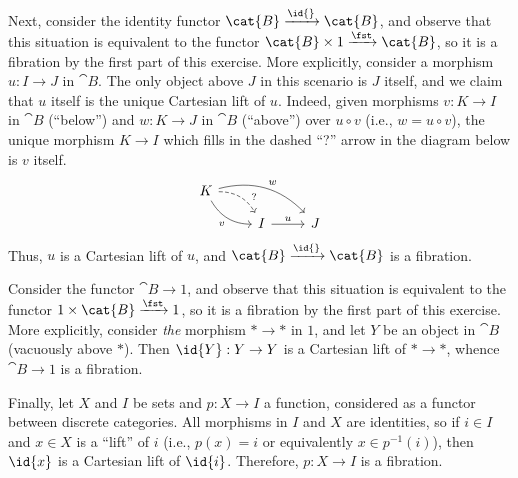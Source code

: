 \begin{solution}
Next, consider the identity functor \(\cat{B} \xrightarrow{\id{}} \cat{B}\), and observe that this situation is equivalent to the functor \(\cat{B} \times 1 \xrightarrow{\fst} \cat{B}\), so it is a fibration by the first part of this exercise.
More explicitly, consider a morphism \(u : I \to J\) in \(\cat{B}\).
The only object above \(J\) in this scenario is \(J\) itself, and we claim that \(u\) itself is the unique Cartesian lift of \(u\).
Indeed, given morphisms \(v : K \to I\) in \(\cat{B}\) (``below'') and \(w : K \to J\) in \(\cat{B}\) (``above'') over \(u \circ v\) (i.e., \(w = u \circ v\)), the unique morphism \(K \to I\) which fills in the dashed ``?'' arrow in the diagram below is \(v\) itself.
\begin{equation*}
\begin{tikzcd}[row sep=small]
K \arrow[rd, bend left, dashed, near end, "?"] \arrow[rd, bend right, "v"{below left}] \arrow[rrd, bend left, "w"] \\
& I \arrow[r, "u"] & J
\end{tikzcd}
\end{equation*}
Thus, \(u\) is a Cartesian lift of \(u\), and \(\cat{B} \xrightarrow{\id{}} \cat{B}\) is a fibration.

Consider the functor \(\cat{B} \to 1\), and observe that this situation is equivalent to the functor \(1 \times \cat{B} \xrightarrow{\fst} 1\), so it is a fibration by the first part of this exercise.
More explicitly, consider \emph{the} morphism \(* \to *\) in \(1\), and let \(Y\) be an object in \(\cat{B}\) (vacuously above \(*\)).
Then \(\id{Y} : Y \to Y\) is a Cartesian lift of \(* \to *\), whence \(\cat{B} \to 1\) is a fibration.

Finally, let \(X\) and \(I\) be sets and \(p : X \to I\) a function, considered as a functor between discrete categories.
All morphisms in \(I\) and \(X\) are identities, so if \(i \in I\) and \(x \in X\) is a ``lift'' of \(i\) (i.e., \(p(x) = i\) or equivalently \(x \in p^{-1}(i)\)), then \(\id{x}\) is a Cartesian lift of \(\id{i}\).
Therefore, \(p : X \to I\) is a fibration.
\end{solution}